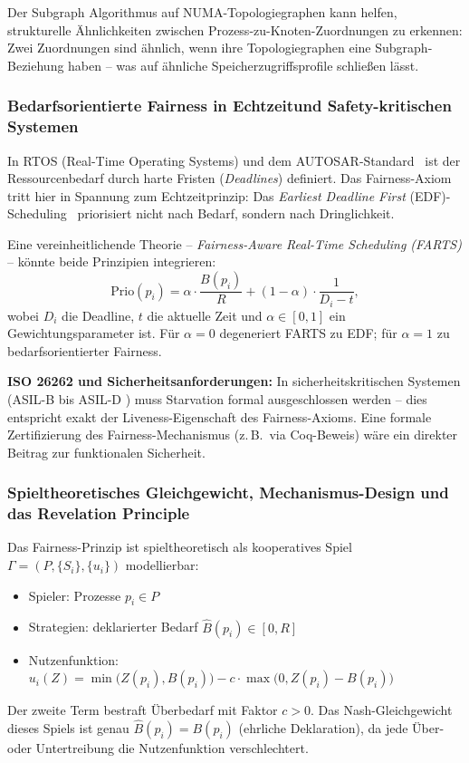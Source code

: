 ﻿\documentclass[a4paper,12pt]{article}
\theoremstyle{definition}
\begin{document}
Der Subgraph Algorithmus auf NUMA-Topologiegraphen kann
helfen, strukturelle Ähnlichkeiten zwischen
Prozess-zu-Knoten-Zuordnungen zu erkennen: Zwei
Zuordnungen sind ähnlich, wenn ihre Topologiegraphen eine
Subgraph-Beziehung haben -- was auf ähnliche
Speicherzugriffsprofile schließen lässt.

\subsubsection{Bedarfsorientierte Fairness in Echtzeitund Safety-kritischen Systemen}

In RTOS (Real-Time Operating Systems) und dem
AUTOSAR-Standard~\cite{autosar2021} ist der Ressourcenbedarf
durch harte Fristen (\emph{Deadlines}) definiert.
Das Fairness-Axiom tritt hier in Spannung zum
Echtzeitprinzip: Das \emph{Earliest Deadline First}
(EDF)-Scheduling~\cite{liu1973scheduling} priorisiert nicht
nach Bedarf, sondern nach Dringlichkeit.

Eine vereinheitlichende Theorie -- \emph{Fairness-Aware
Real-Time Scheduling (FARTS)} -- könnte beide Prinzipien
integrieren:
\[
  \mathrm{Prio}(p_i) = \alpha \cdot \frac{B(p_i)}{R}
                      + (1-\alpha) \cdot \frac{1}{D_i - t},
\]
wobei $D_i$ die Deadline, $t$ die aktuelle Zeit und
$\alpha \in [0,1]$ ein Gewichtungsparameter ist.
Für $\alpha = 0$ degeneriert FARTS zu EDF;
für $\alpha = 1$ zu bedarfsorientierter Fairness.

\textbf{ISO 26262 und Sicherheitsanforderungen:}
In sicherheitskritischen Systemen (ASIL-B bis ASIL-D
\cite{iso26262}) muss Starvation formal ausgeschlossen
werden -- dies entspricht exakt der Liveness-Eigenschaft
des Fairness-Axioms. Eine formale Zertifizierung des
Fairness-Mechanismus (z.\,B.\ via Coq-Beweis) wäre
ein direkter Beitrag zur funktionalen Sicherheit.

\subsubsection{Spieltheoretisches Gleichgewicht, Mechanismus-Design
und das Revelation Principle}

Das Fairness-Prinzip ist spieltheoretisch als kooperatives
Spiel $\Gamma = (P, \{S_i\}, \{u_i\})$ modellierbar:
\begin{itemize}
  \item Spieler: Prozesse $p_i \in P$
  \item Strategien: deklarierter Bedarf $\hat{B}(p_i)
        \in [0, R]$
  \item Nutzenfunktion:
        $u_i(Z) = \min\!\bigl(Z(p_i), B(p_i)\bigr) -
        c \cdot \max\!\bigl(0, Z(p_i) - B(p_i)\bigr)$
\end{itemize}
Der zweite Term bestraft Überbedarf mit Faktor $c > 0$.
Das Nash-Gleichgewicht~\cite{nash1950equilibrium} dieses Spiels
ist genau $\hat{B}(p_i) = B(p_i)$ (ehrliche Deklaration),
da jede Über- oder Untertreibung die Nutzenfunktion
verschlechtert.
\end{document}
